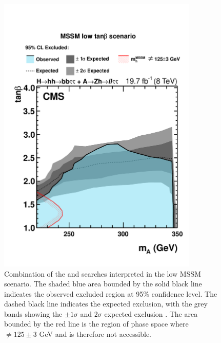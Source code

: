 \begin{figure}[h!]
\begin{center}
\includegraphics[width=0.85\textwidth]{Hhh/Plots/CMS-HIG-14-034_Figure_011.pdf}
\caption{Combination of the \AtoZhtolltautau and \Htohhtobbtautau searches
interpreted in the low \tanb MSSM scenario. The shaded blue area bounded by
the solid black line indicates the observed excluded region at 95\% confidence level.
The dashed black line indicates the expected exclusion, with the grey bands showing
the $\pm 1\sigma$ and $2\sigma$ expected exclusion \cite{CMS-HIG-14-034}. The area
bounded by the red line is the region of phase space where \mh $\neq 125 \pm 3$ 
GeV and is therefore not accessible.}
\label{fig:HhhAZhMSSM}
\end{center}
\end{figure}
